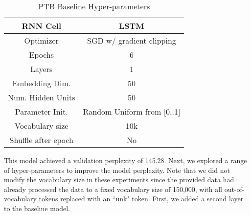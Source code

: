 \documentclass[a4paper]{article}
\begin{document}
\begin{table}[h!]
\centering
\begin{tabular}{|c | c|} 
 \hline
RNN Cell & LSTM\\ \hline
Optimizer & SGD w/ gradient clipping \\ \hline
Epochs & 6\\ \hline
Layers & 1\\ \hline
Embedding Dim. & 50\\ \hline
Num. Hidden Units & 50\\ \hline
Parameter Init. & Random Uniform from [0,.1]\\ \hline
Vocabulary size & 10k\\ \hline
Shuffle after epoch & No \\ \hline
\end{tabular}
\caption{PTB Baseline Hyper-parameters}
\label{table:1}
\end{table}

This model achieved a validation perplexity of 145.28. 
\newline
\newline
Next, we explored a range of hyper-parameters to improve the model perplexity. Note that we did not modify the vocabulary size in these experiments since the provided data had already processed the data to a fixed vocabulary size of 150,000, with all out-of-vocabulary tokens replaced with an ``unk" token. 
\newline
\newline
First, we added a second layer to the baseline model. 

\newline
\newline
[Analysis]
\end{document}
